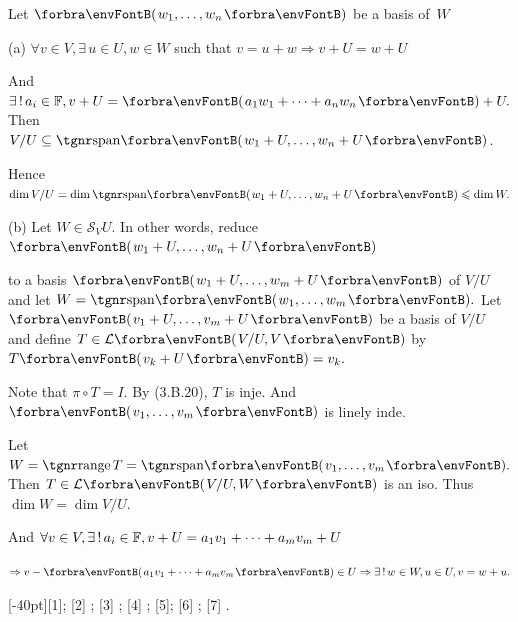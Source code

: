 \documentclass[a4paper, 11pt, UTF8]{article}
\begin{document}
\begin{large}
Let $\Par{w_1,\dots,w_n}$ be a basis of \,$W$\par\quad
(a) $\forall v\in V,\exists\,u\in U,w\in W$ such that $v=u+w\Rightarrow v+U=w+U$\par\quad\Ha
And $\exists\,!\,a_i\in\Fbb,v+U=\Par{a_1w_1+\dots+a_nw_n}+U.$ Then $V/U\subseteq\Span{w_1+U,\dots,w_n+U}$.\par\quad\Ha
Hence $\dim V/U=\dim\Span{w_1+U,\dots,w_n+U}\leqslant\dim W.$\par\quad
(b) Let $W\in\mathcal{S}_V U.$ In other words, reduce $\Par{w_1+U,\dots,w_n+U}$\par\quad\Hb
to a basis $\Par{w_1+U,\dots,w_m+U}$ of $V/U$ and let $W=\Span{w_1,\dots,w_m}.$\PfEnd\vspace{4pt}\quad\Hb
\Or Let $\Par{v_1+U,\dots,v_m+U}$ be a basis of $V/U$ and define $T\in\Lm{V/U,V}$ by $T\Par{v_k+U}=v_k.$\par\quad\Hb
Note that $\pi\circ T=I.$ By (3.B.20), $T$ is inje. And $\Par{v_1,\dots,v_m}$ is linely inde.\par\quad\Hb
Let $W=\range T=\Span{v_1,\dots,v_m}.$ Then $T\in\Lm{V/U,W}$ is an iso. Thus $\dim W=\dim V/U.$\par\quad\Hb
And $\forall v\in V,\exists\,!\,a_i\in{\mathbb{F}},v+U=a_1v_1+\dots+a_mv_m+U$\par\quad\Hb
{} $\Rightarrow v-\Par{a_1v_1+\dots+a_mv_m}\in U\Rightarrow\exists\,!\,w\in W,u\in U,v=w+u.$\PfEnd
\SepLine
\ChEnd\vspace{10pt}

[-40pt]{[1]; [2] ; [3] ; [4] ; [5]; [6] ; [7] .}


\end{large}
\end{document}
